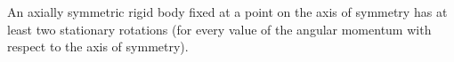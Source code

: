 An axially symmetric rigid body fixed at a point on the axis of symmetry has at least two stationary rotations (for every value of the angular momentum with respect to the axis of symmetry).
